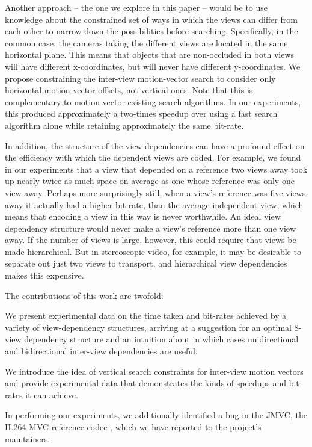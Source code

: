\documentclass[twoside, 11pt]{article}
\begin{document}
Another approach -- the one we explore in this paper -- would be to use
knowledge about the constrained set of ways in which the views can differ from
each other to narrow down the possibilities before searching. Specifically,
in the common case, the cameras taking the different views are located in the
same horizontal plane. This means that objects that are non-occluded in both
views will have different x-coordinates, but will never have different
y-coordinates. We propose constraining the inter-view motion-vector search to
consider only horizontal motion-vector offsets, not vertical ones. Note that
this is complementary to motion-vector existing search algorithms. In our
experiments, this produced approximately a two-times speedup over using a
fast search algorithm alone while retaining approximately the same bit-rate.

In addition, the structure of the view dependencies can have a profound effect
on the efficiency with which the dependent views are coded. For example, we
found in our experiments that a view that depended on a reference two views away
took up nearly twice as much space on average as one whose reference was only
one view away. Perhaps more surprisingly still, when a view's reference was five
views away it actually had a higher bit-rate, than the average independent view,
which means that encoding a view in this way is never worthwhile. An ideal view
dependency structure would never make a view's reference more than one view
away. If the number of views is large, however, this could require that views
be made hierarchical. But in stereoscopic video, for example, it may be
desirable to separate out just two views to transport, and hierarchical
view dependencies makes this expensive.

The contributions of this work are twofold: \begin{compactitem}
\item We present experimental data on the time taken and bit-rates achieved by a
variety of view-dependency structures, arriving at a suggestion for an optimal
8-view dependency structure and an intuition about in which cases unidirectional
and bidirectional inter-view dependencies are useful.
\item We introduce the idea of vertical search constraints for inter-view motion
vectors and provide experimental data that demonstrates the kinds of speedups
and bit-rates it can achieve. \end{compactitem} In performing our experiments,
we additionally identified a bug in the JMVC, the H.264 MVC reference
codec \cite{sch10}, which we have reported to the project's maintainers.
\end{document}
